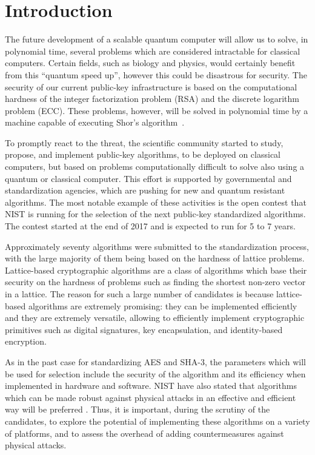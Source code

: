 \section{Introduction} \label{sec:Introdution}

The future development of a scalable quantum computer will allow us to solve, in polynomial time, several problems which are considered intractable for classical computers. Certain fields, such as biology and physics, would certainly benefit from this ``quantum speed up'', however this could be disastrous for security. The security of our current public-key infrastructure is based on the computational hardness of the integer factorization problem (RSA) and the discrete logarithm problem (ECC). These problems, however, will be solved in polynomial time by a machine capable of executing Shor's algorithm~\cite{Shor}.

To promptly react to the threat, the scientific community started to study, propose, and implement public-key algorithms, to be deployed on classical computers, but based on problems computationally difficult to solve also using a quantum or classical computer. This effort is supported by governmental and standardization agencies, which are pushing for new and quantum resistant algorithms. The most notable example of these activities is the open contest that NIST \cite{nistpq} is running for the selection of the next public-key standardized algorithms. The contest started at the end of 2017 and is expected to run for 5 to 7 years.

Approximately seventy algorithms were submitted to the standardization process, with the large majority of them being based on the hardness of lattice problems. Lattice-based cryptographic algorithms are a class of algorithms which base their security on the hardness of problems such as finding the shortest non-zero vector in a lattice. The reason for such a large number of candidates is because lattice-based algorithms are extremely promising: they can be implemented efficiently and they are extremely versatile, allowing to efficiently implement cryptographic primitives such as digital signatures, key encapsulation, and identity-based encryption. 

As in the past case for standardizing AES and SHA-3, the parameters which will be used for selection include the security of the algorithm and its efficiency when implemented in hardware and software. NIST have also stated that algorithms which can be made robust against physical attacks in an effective and efficient way will be preferred \cite{nistsca}. Thus, it is important, during the scrutiny of the candidates, to explore the potential of implementing these algorithms on a variety of platforms, and to assess the overhead of adding countermeasures against physical attacks.

